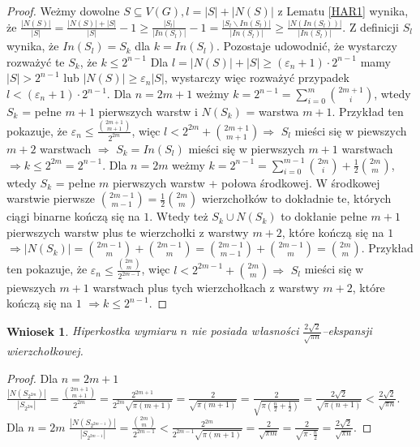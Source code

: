 \documentclass{pracamgr}
\newtheorem{corollary}[theorem]{Wniosek}
\begin{document}
   \begin{proof}
    Weżmy dowolne $S\subseteq V(G), l=|S|+|N(S)|$ z Lematu \ref{HAR1} wynika, że
    $\frac{|N(S)|}{|S|}=\frac{|N(S)|+|S|}{|S|}-1\ge\frac{|S_l|}{|In(S_l)|}-1=\frac{|S_l\backslash In(S_l)|}{|In(S_l)|}\ge\frac{|N(In(S_l))|}{|In(S_l)|}$.
    Z definicji $S_l$ wynika, że $In(S_l)=S_k$ dla $k=In(S_l)$.\newline
    Pozostaje udowodnić, że wystarczy rozważyć te $S_k$, że $k\le2^{n-1}$\newline
    Dla $l=|N(S)|+|S|\ge(\varepsilon_n+1)\cdot 2^{n-1}$ mamy $|S|>2^{n-1}$ lub $|N(S)|\ge\varepsilon_n|S|$, wystarczy więc rozważyć przypadek
    $l<(\varepsilon_n+1)\cdot 2^{n-1}$.\newline
    Dla $n=2m+1$ weżmy $k=2^{n-1}=\sum_{i=0}^{m}{2m+1 \choose i}$, wtedy $S_k$ = pełne $m+1$ pierwszych warstw i $N(S_k)$ = warstwa $m+1$.
    Przykład ten pokazuje, że $\varepsilon_n\le\frac{{2m+1 \choose m+1}}{2^{2m}}$,
    więc $l<2^{2m}+{2m+1 \choose m+1}\Rightarrow$ $S_l$ mieści się w piewszych $m+2$ warstwach
    $\Rightarrow$ $S_k=In(S_l)$ mieści się w pierwszych $m+1$ warstwach $\Rightarrow k\le 2^{2m}=2^{n-1}$.\newline
    Dla $n=2m$ weżmy $k=2^{n-1}=\sum_{i=0}^{m-1}{2m \choose i}+\frac{1}{2}{2m\choose m}$, wtedy $S_k$ = pełne $m$ pierwszych warstw + połowa środkowej.
    W środkowej warstwie pierwsze ${2m-1\choose m-1}=\frac{1}{2}{2m \choose m}$ wierzchołków to dokładnie te, których ciągi binarne kończą się na $1$.
    Wtedy też $S_k\cup N(S_k)$ to dokłanie pełne $m+1$ pierwszych warstw plus te wierzchołki z warstwy $m+2$, które kończą się na $1$
    $\Rightarrow |N(S_k)|={2m-1\choose m}+{2m-1\choose m}={2m-1\choose m-1}+{2m-1 \choose m}={2m\choose m}$.
    Przykład ten pokazuje, że $\varepsilon_n\le\frac{{2m \choose m}}{2^{2m-1}}$,
    więc $l<2^{2m-1}+{2m \choose m}\Rightarrow$ $S_l$ mieści się w piewszych $m+1$ warstwach plus tych wierzchołkach z warstwy $m+2$, które kończą się na $1$
    $\Rightarrow k\le2^{n-1}$.
   \end{proof}
   \begin{corollary}\label{ograniczenie ekspansji}
    Hiperkostka wymiaru $n$ nie posiada własności $\frac{2\sqrt{2}}{\sqrt{\pi n}}$--ekspansji wierzchołkowej.
   \end{corollary}
   \begin{proof}%
    Dla $n=2m+1$\newline
    $\frac{|N(S_{2^{2m}})|}{|S_{2^{2m}}|}=\frac{{2m+1 \choose m+1}}{2^{2m}}=\frac{2^{2m+1}}{2^{2m}\sqrt{\pi(m+1)}}=\frac{2}{\sqrt{\pi(m+1)}}=
    \frac{2}{\sqrt{\pi(\frac{n}{2}+\frac{1}{2})}}=\frac{2\sqrt{2}}{\sqrt{\pi(n+1)}}<\frac{2\sqrt{2}}{\sqrt{\pi n}}$.\newline
    Dla $n=2m$
    $\frac{|N(S_{2^{2m-1}})|}{|S_{2^{2m-1}}|}=\frac{{2m \choose m}}{2^{2m-1}}<\frac{2^{2m}}{2^{2m-1}\sqrt{\pi(m+1)}}=\frac{2}{\sqrt{\pi m}}=
    \frac{2}{\sqrt{\pi\cdot\frac{n}{2}}}=\frac{2\sqrt{2}}{\sqrt{\pi n}}$.
   \end{proof}
\end{document}
